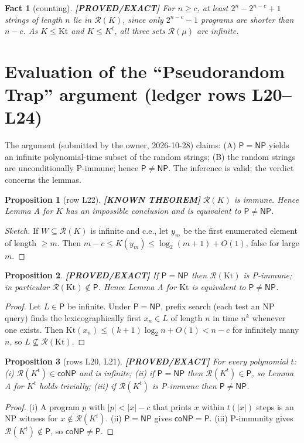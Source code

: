 \documentclass[11pt]{article}
\newtheorem{proposition}{Proposition}
\newtheorem*{fact}{Fact}
\theoremstyle{remark}
\newcommand{\Kt}{\mathrm{Kt}}
\newcommand{\Kpt}{K^{t}}
\newcommand{\R}{\mathcal{R}}
\newcommand{\cP}{\mathsf{P}}
\newcommand{\NP}{\mathsf{NP}}
\newcommand{\coNP}{\mathsf{coNP}}
\newcommand{\status}[1]{\textbf{[#1]}}
\begin{document}
\begin{fact}[counting] \status{PROVED/EXACT}
For $n\ge c$, at least $2^n-2^{n-c}+1$ strings of length $n$ lie in $\R(K)$, since only $2^{n-c}-1$
programs are shorter than $n-c$. As $K\le \Kt$ and $K\le\Kpt$, all three sets $\R(\mu)$ are infinite.
\end{fact}

\section{Evaluation of the ``Pseudorandom Trap'' argument (ledger rows L20--L24)}

The argument (submitted by the owner, 2026-10-28) claims: (A) $\cP=\NP$ yields an infinite
polynomial-time subset of the random strings; (B) the random strings are unconditionally P-immune;
hence $\cP\neq\NP$. The inference is valid; the verdict concerns the lemmas.

\begin{proposition}[row L22] \status{KNOWN THEOREM}
$\R(K)$ is immune. Hence Lemma A for $K$ has an impossible conclusion and is equivalent to $\cP\neq\NP$.
\end{proposition}
\begin{proof}[Sketch]
If $W\subseteq\R(K)$ is infinite and c.e., let $y_m$ be the first enumerated element of length $\ge m$.
Then $m-c\le K(y_m)\le \log_2(m+1)+O(1)$, false for large $m$.
\end{proof}

\begin{proposition} \status{PROVED/EXACT}
If $\cP=\NP$ then $\R(\Kt)$ is P-immune; in particular $\R(\Kt)\notin\cP$. Hence Lemma A for $\Kt$ is
equivalent to $\cP\neq\NP$.
\end{proposition}
\begin{proof}
Let $L\in\cP$ be infinite. Under $\cP=\NP$, prefix search (each test an NP query) finds the
lexicographically first $x_n\in L$ of length $n$ in time $n^k$ whenever one exists. Then
$\Kt(x_n)\le (k+1)\log_2 n+O(1)<n-c$ for infinitely many $n$, so $L\not\subseteq\R(\Kt)$.
\end{proof}

\begin{proposition}[rows L20, L21] \status{PROVED/EXACT}
For every polynomial $t$: (i) $\R(\Kpt)\in\coNP$ and is infinite; (ii) if $\cP=\NP$ then
$\R(\Kpt)\in\cP$, so Lemma A for $\Kpt$ holds trivially; (iii) if $\R(\Kpt)$ is P-immune then
$\cP\neq\NP$.
\end{proposition}
\begin{proof}
(i) A program $p$ with $|p|<|x|-c$ that prints $x$ within $t(|x|)$ steps is an NP witness for
$x\notin\R(\Kpt)$. (ii) $\cP=\NP$ gives $\coNP=\cP$. (iii) P-immunity gives $\R(\Kpt)\notin\cP$,
so $\coNP\neq\cP$.
\end{proof}
\end{document}
